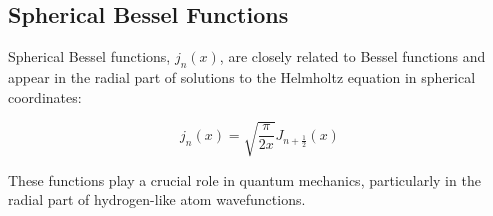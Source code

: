 \documentclass{article}
\begin{document}
\subsection{Spherical Bessel Functions}

Spherical Bessel functions, $j_n(x)$, are closely related to Bessel functions and appear in the radial part of solutions to the Helmholtz equation in spherical coordinates:

\[j_n(x) = \sqrt{\frac{\pi}{2x}}J_{n+\frac{1}{2}}(x)\]

These functions play a crucial role in quantum mechanics, particularly in the radial part of hydrogen-like atom wavefunctions.
\end{document}
